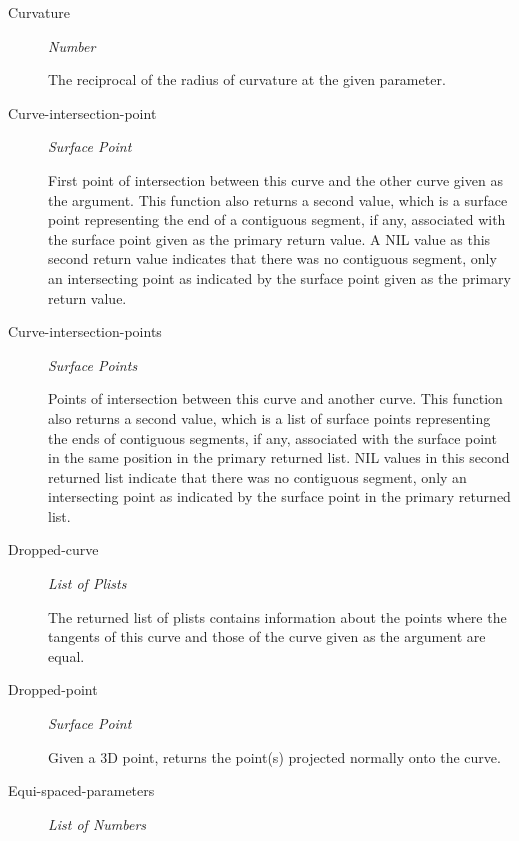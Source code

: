 \documentclass [11pt]{book}
\begin{document}
\begin{itemize}
\begin{description}
\item [Curvature]
\emph{Number}

 The reciprocal of the radius of curvature at the given parameter.




\item [Curve-intersection-point]
\emph{Surface Point}

  First point of intersection between this curve and the other curve given as the argument.
This function also returns a second value, which is a surface point representing the end of
a contiguous segment, if any, associated with the surface point given as the primary return value.
A NIL value as this second return value indicates that there was no contiguous segment, only an
intersecting point as indicated by the surface point given as the primary return value.




\item [Curve-intersection-points]
\emph{Surface Points}

  Points of intersection between this curve and another curve.
This function also returns a second value, which is a list of surface points representing the ends of
contiguous segments, if any, associated with the surface point in the same position in the primary returned list.
NIL values in this second returned list indicate that there was no contiguous segment, only an intersecting point
as indicated by the surface point in the primary returned list.




\item [Dropped-curve]
\emph{List of Plists}

 The returned list of plists contains information about the points where the tangents of this curve and those of the curve given as the argument
are equal.




\item [Dropped-point]
\emph{Surface Point}

 Given a 3D point, returns the point(s) projected normally onto the curve.




\item [Equi-spaced-parameters]
\emph{List of Numbers}


\end{description}
\end{itemize}
\end{document}
